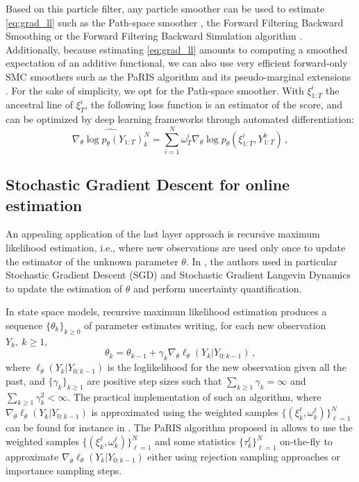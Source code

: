 \documentclass[journal]{IEEEtran}
\begin{document}
Based on this particle filter, any particle smoother can be used to estimate \eqref{eq:grad_ll} such as the Path-space smoother \cite{Kitagawa1996}, the Forward Filtering Backward Smoothing \cite{Doucet2000OnSM} or the Forward Filtering Backward Simulation algorithm \cite{Godsill2004MonteCS}.
Additionally, because estimating \eqref{eq:grad_ll} amounts to computing a smoothed expectation of an additive functional, we can also use very efficient forward-only SMC smoothers such as the PaRIS algorithm and its pseudo-marginal extensions \cite{Olsson2014EfficientPO,gloaguen2022pseudo}.
For the sake of simplicity, we opt for the Path-space smoother. 
With $\xi^i_{1:T}$ the ancestral line of $\xi^i_{T}$, the following loss function is an estimator of the score, and can be optimized by deep learning frameworks through automated differentiation:
$$
	\widehat {\nabla_\theta \log p_\theta(Y_{1:T})_k^N} = \sum_{i=1}^N \omega_T^i\nabla_\theta\log p_\theta(\xi^i_{1:T}, Y^{k}_{1:T})\,,
$$

\subsection{Stochastic Gradient Descent for online estimation}
An appealing application of the last layer approach is recursive maximum likelihood estimation, i.e., where new observations are used only once to update the estimator of the unknown parameter $\theta$. In \cite{Brosse2020OnLA}, the authors used in particular Stochastic Gradient Descent (SGD) and Stochastic Gradient Langevin Dynamics to update the estimation of $\theta$ and perform uncertainty quantification.

In state space models, recursive maximum likelihood estimation produces a sequence $\lbrace\theta_k\rbrace_{k\geq 0}$ of parameter estimates writing, for each new observation $Y_{k},~k\geq 1$,
$$
	\theta_{k} = \theta_{k-1} + \gamma_k \nabla_\theta \ell_{\theta}(Y_k | Y_{0:k - 1}) \,,
$$
where $\ell_{\theta}(Y_k | Y_{0:k - 1})$ is the loglikelihood for the new observation given all the past, and $\lbrace\gamma_k\rbrace_{k\geq 1}$ are positive step sizes such that $\sum_{k \geq 1}\gamma_k = \infty$ and $\sum_{k \geq 1}\gamma_k^2 < \infty$. The practical implementation of such an algorithm, where $\nabla_\theta\ell_{\theta}(Y_k | Y_{0:k - 1})$ is approximated using the weighted samples $\{(\xi^{\ell}_k,\omega^{\ell}_k)\}_{\ell=1}^N$ can be found for instance in \cite{gloaguen2022pseudo}. The PaRIS algorithm proposed in \cite{Olsson2014EfficientPO} allows to use the weighted samples $\{(\xi^{\ell}_k,\omega^{\ell}_k)\}_{\ell=1}^N$ and some statistics $\{\tau^{\ell}_k\}_{\ell=1}^N$ on-the-fly to approximate $\nabla_\theta \ell_{\theta}(Y_k | Y_{0:k - 1})$ either using rejection sampling approaches or importance sampling steps.
\end{document}
